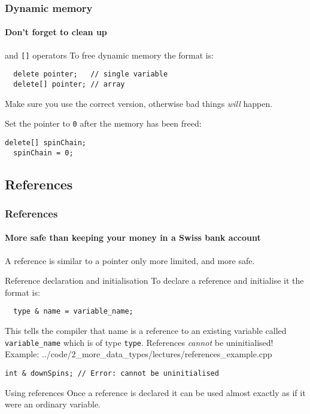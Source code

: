 \documentclass{beamer}
\begin{document}
\begin{frame}[fragile]
  \frametitle{Dynamic memory}
  \framesubtitle{Don't forget to clean up}
  
  \begin{block}{ and \texttt{[]} operators}
    To free dynamic memory the format is:
    \begin{lstlisting}
  delete pointer;   // single variable
  delete[] pointer; // array
    \end{lstlisting}
    Make sure you use the correct version, otherwise bad things \textit{will} happen.
  \end{block}
  \pause
  \pause
  \begin{doblocke}
  Set the pointer to \texttt{0} after the memory has been freed:
  \begin{lstlisting}[belowskip=0pt]
  delete[] spinChain;
  spinChain = 0;
  \end{lstlisting}
  \end{doblocke}
\end{frame}

\subsection{References}

\begin{frame}[fragile]
  \frametitle{References}
  \framesubtitle{More safe than keeping your money in a Swiss bank account}
  
  A reference is similar to a pointer only more limited, and more safe.
  \begin{block}{Reference declaration and initialisation}
	  To declare a reference and initialise it the format is:
		  \begin{lstlisting}
  type & name = variable_name;
		  \end{lstlisting}
	  This tells the compiler that name is a reference to an existing variable called \texttt{variable\_name} which is of type \texttt{type}.  References \textit{cannot} be uninitialised!\newline
		Example:
      {../code/2_more_data_types/lectures/references_example.cpp}
    \begin{lstlisting}[aboveskip=0pt,belowskip=0pt]
  int & downSpins; // Error: cannot be uninitialised
    \end{lstlisting}  
  \end{block}
  \pause
  \begin{block}{Using references}
  	Once a reference is declared it can be used almost exactly as if it were an ordinary variable.
  \end{block}

\end{frame}
\end{document}
